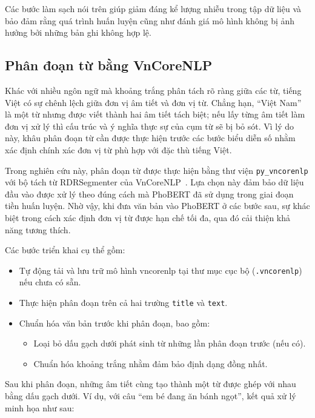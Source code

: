 Các bước làm sạch nói trên giúp giảm đáng kể lượng nhiễu trong tập dữ liệu và bảo đảm rằng quá trình huấn luyện cũng như đánh giá mô hình không bị ảnh hưởng bởi những bản ghi không hợp lệ.

\subsection{Phân đoạn từ bằng VnCoreNLP}

Khác với nhiều ngôn ngữ mà khoảng trắng phân tách rõ ràng giữa các từ, tiếng Việt có sự chênh lệch giữa đơn vị âm tiết và đơn vị từ. Chẳng hạn, ``Việt Nam'' là một từ nhưng được viết thành hai âm tiết tách biệt; nếu lấy từng âm tiết làm đơn vị xử lý thì cấu trúc và ý nghĩa thực sự của cụm từ sẽ bị bỏ sót. Vì lý do này, khâu phân đoạn từ cần được thực hiện trước các bước biểu diễn số nhằm xác định chính xác đơn vị từ phù hợp với đặc thù tiếng Việt.

Trong nghiên cứu này, phân đoạn từ được thực hiện bằng thư viện \texttt{py\_vncorenlp} với bộ tách từ RDRSegmenter của VnCoreNLP~\cite{vncore_2018, rdrsegmenter2018}. Lựa chọn này đảm bảo dữ liệu đầu vào được xử lý theo đúng cách mà PhoBERT đã sử dụng trong giai đoạn tiền huấn luyện. Nhờ vậy, khi đưa văn bản vào PhoBERT ở các bước sau, sự khác biệt trong cách xác định đơn vị từ được hạn chế tối đa, qua đó cải thiện khả năng tương thích.

Các bước triển khai cụ thể gồm:

\begin{itemize}[leftmargin=2em]
  \item Tự động tải và lưu trữ mô hình vncorenlp tại thư mục cục bộ (\texttt{.vncorenlp}) nếu chưa có sẵn.
  \item Thực hiện phân đoạn trên cả hai trường \texttt{title} và \texttt{text}.
  \item Chuẩn hóa văn bản trước khi phân đoạn, bao gồm:
  \begin{itemize}
    \item Loại bỏ dấu gạch dưới phát sinh từ những lần phân đoạn trước (nếu có).
    \item Chuẩn hóa khoảng trắng nhằm đảm bảo định dạng đồng nhất.
  \end{itemize}
\end{itemize}

Sau khi phân đoạn, những âm tiết cùng tạo thành một từ được ghép với nhau bằng dấu gạch dưới. Ví dụ, với câu ``em bé đang ăn bánh ngọt'', kết quả xử lý minh họa như sau:

